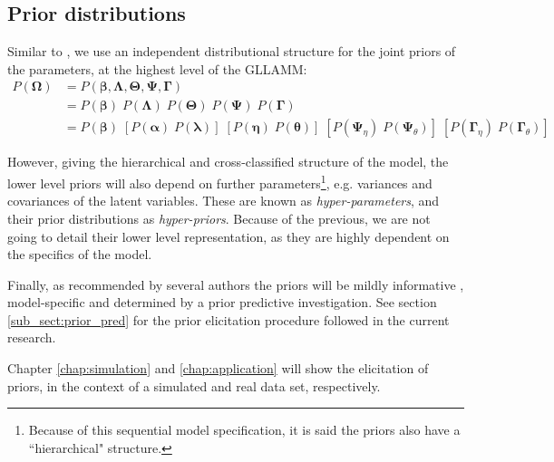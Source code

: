 
\subsection{Prior distributions} \label{sub_sect:priors}

Similar to \citet{Patz_et_al_1999}, we use an independent distributional structure for the joint priors of the parameters, at the highest level of the GLLAMM:
%
\begin{equation} \label{eq:priors}
	\begin{split}
		P( \pmb{\Omega} ) & = P( \pmb{\beta}, \pmb{\Lambda}, \pmb{\Theta}, \pmb{\Psi}, \pmb{\Gamma} ) \\
		&= P( \pmb{\beta} ) \; P( \pmb{\Lambda} ) \; P( \pmb{\Theta} ) \; P( \pmb{\Psi} ) \; P( \pmb{\Gamma} ) \\
		&= P( \pmb{\beta} ) \; \left[ P( \pmb{\alpha} ) \; P( \pmb{\lambda} ) \right] \; \left[ P( \pmb{\eta} ) \; P( \pmb{\theta} ) \right] \; \left[ P( \pmb{\Psi}_{\eta} ) \; P( \pmb{\Psi}_{\theta} ) \right] \; \left[ P( \pmb{\Gamma}_{\eta} ) \; P( \pmb{\Gamma}_{\theta} ) \right]
	\end{split}
\end{equation}

However, giving the hierarchical and cross-classified structure of the model, the lower level priors will also depend on further parameters\footnote{Because of this sequential model specification, it is said the priors also have a ``hierarchical" structure.}, e.g. variances and covariances of the latent variables. These are known as \textit{hyper-parameters}, and their prior distributions as \textit{hyper-priors}. Because of the previous, we are not going to detail their lower level representation, as they are highly dependent on the specifics of the model.

Finally, as recommended by several authors the priors will be mildly informative \cite{McElreath_2020, Fujimoto_2020, Tarazona_2013, Jiao_et_al_2012, Azevedo_2003, Wollack_2002}, model-specific and determined by a prior predictive investigation. See section \ref{sub_sect:prior_pred} for the prior elicitation procedure followed in the current research. 

Chapter \ref{chap:simulation} and \ref{chap:application} will show the elicitation of priors, in the context of a simulated and real data set, respectively.


